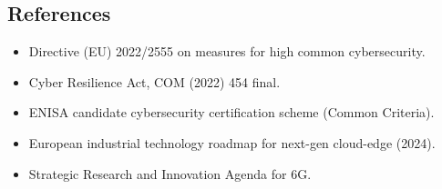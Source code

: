\documentclass[12pt,a4paper]{article}
\begin{document}
\subsection{References}
\begin{itemize}[leftmargin=1.5cm, labelsep=0.2cm]
    \item[{[NIS2]}] Directive (EU) 2022/2555 on measures for high common cybersecurity.
    \item[{[CRA]}] Cyber Resilience Act, COM (2022) 454 final.
    \item[{[EUCC]}] ENISA candidate cybersecurity certification scheme (Common Criteria).
    \item[{[Cloud-Edge]}] European industrial technology roadmap for next-gen cloud-edge (2024).
    \item[{[SNS JU]}] Strategic Research and Innovation Agenda for 6G.
\end{itemize}
\end{document}
